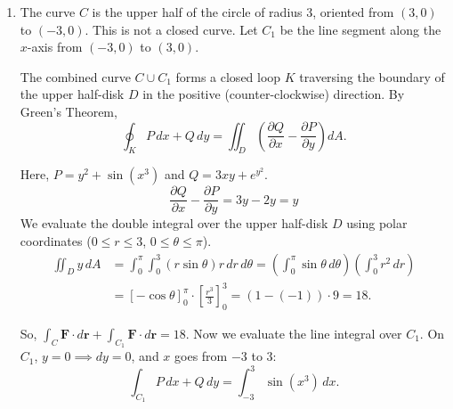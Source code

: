 \documentclass[a4paper, 12pt]{article}
\begin{document}
\begin{enumerate}[leftmargin=*,label=\textbf{\arabic*.}]
\begin{enumerate}[leftmargin=*,label=\textbf{\alph*.}]
\item By the Fundamental Theorem of Line Integrals, $\int_C \mathbf{F} \cdot d\mathbf{r} = \phi(\mathbf{r}(1)) - \phi(\mathbf{r}(0))$.
\begin{itemize}
\item Start point: $\mathbf{r}(0) = \langle 0, 0, 0 \rangle \implies \phi(0, 0, 0) = 0 + 0 + \cos(0) + 0 = 1$.
\item End point: $\mathbf{r}(1) = \left\langle 1, 0, \frac{\pi}{2} \right\rangle \implies \phi\left(1, 0, \frac{\pi}{2}\right) = 1^2 e^0 + \sin\left(\frac{\pi}{2}\right) + \cos(0) + \left(\frac{\pi}{2}\right)^2 = 1 + 1 + 1 + \frac{\pi^2}{4} = 3 + \frac{\pi^2}{4}$.
\end{itemize}

The integral is
\[\boxed{\left(3 + \frac{\pi^2}{4}\right) - 1 = 2 + \frac{\pi^2}{4}}.\]
\end{enumerate}

\newpage

\item The curve $C$ is the upper half of the circle of radius 3, oriented from $(3, 0)$ to $(-3, 0)$. This is not a closed curve. Let $C_1$ be the line segment along the $x$-axis from $(-3, 0)$ to $(3, 0)$.

The combined curve $C \cup C_1$ forms a closed loop $K$ traversing the boundary of the upper half-disk $D$ in the positive (counter-clockwise) direction. By Green's Theorem,
\[\oint_K P\,dx + Q\,dy = \iint_D \left(\frac{\partial Q}{\partial x} - \frac{\partial P}{\partial y}\right) dA.\]

Here, $P = y^2 + \sin(x^3)$ and $Q = 3xy + e^{y^2}$.
\[\frac{\partial Q}{\partial x} - \frac{\partial P}{\partial y} = 3y - 2y = y\]
We evaluate the double integral over the upper half-disk $D$ using polar coordinates ($0 \le r \le 3$, $0 \le \theta \le \pi$).
\begin{align*}\iint_D y\,dA &= \int_0^\pi \int_0^3 (r \sin\theta) r\,dr\,d\theta = \left(\int_0^\pi \sin\theta\,d\theta\right)\left(\int_0^3 r^2\,dr\right) \\[1em]&= [-\cos\theta]_0^\pi \cdot \left[\frac{r^3}{3}\right]_0^3 = (1 - (-1)) \cdot 9 = 18.\end{align*}

So, $\int_C \mathbf{F} \cdot d\mathbf{r} + \int_{C_1} \mathbf{F} \cdot d\mathbf{r} = 18$. Now we evaluate the line integral over $C_1$. On $C_1$, $y = 0 \implies dy = 0$, and $x$ goes from $-3$ to $3$:
\[\int_{C_1} P\,dx + Q\,dy = \int_{-3}^3 \sin(x^3)\,dx.\]


\end{enumerate}
\end{document}
